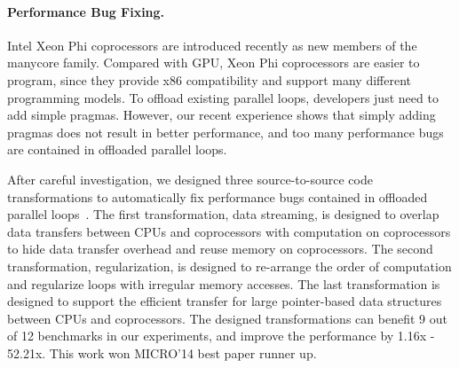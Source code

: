 \documentclass[10pt]{article}
\begin{document}
\vspace{-.1in}
\paragraph{Performance Bug Fixing.}
Intel Xeon Phi coprocessors are introduced recently as new members of the manycore family. 
Compared with GPU, Xeon Phi coprocessors are easier to program,
since they provide x86 compatibility and support many different programming models.
To offload existing parallel loops, developers just need to add simple pragmas. 
However, our recent experience shows that simply adding pragmas does not result in better performance, 
and too many performance bugs are contained in offloaded parallel loops. 

After careful investigation, we designed three source-to-source code transformations to 
automatically fix performance bugs contained in offloaded parallel loops~\cite{Song14MICRO}. 
The first transformation, data streaming, is designed to overlap data transfers between CPUs and coprocessors
with computation on coprocessors to hide data transfer overhead and reuse memory on coprocessors. 
The second transformation, regularization, is designed to re-arrange the order of computation and regularize loops with irregular memory accesses. 
The last transformation is designed to support the efficient transfer for large pointer-based data structures between CPUs and coprocessors. 
The designed transformations can benefit 9 out of 12 benchmarks in our experiments, and improve the performance by 1.16x - 52.21x. 
This work won MICRO'14 best paper runner up. 

\end{document}
